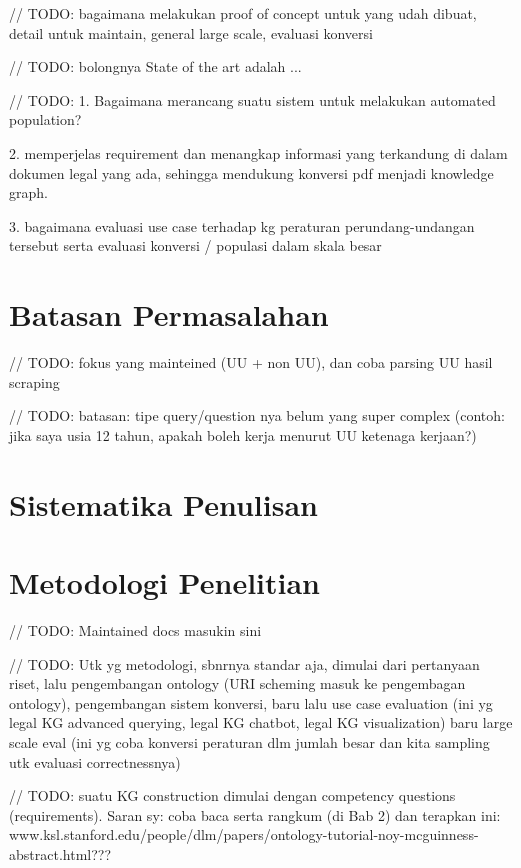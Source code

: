// TODO: bagaimana melakukan proof of concept untuk yang udah dibuat, detail untuk maintain, general
large scale, evaluasi konversi

// TODO: bolongnya State of the art adalah ...

// TODO: 1. Bagaimana merancang suatu sistem untuk melakukan automated population? 

2. memperjelas requirement dan menangkap informasi yang terkandung di dalam dokumen legal yang ada,
sehingga mendukung konversi pdf menjadi knowledge graph. 

3. bagaimana evaluasi use case terhadap kg peraturan perundang-undangan tersebut serta evaluasi
konversi / populasi dalam skala besar

\section{Batasan Permasalahan}\label{sec:batasan-permasalahan}

// TODO: fokus yang mainteined (UU + non UU), dan coba parsing UU hasil scraping

// TODO: batasan: tipe query/question nya belum yang super complex (contoh: jika saya usia 12 tahun,
apakah boleh kerja menurut UU ketenaga kerjaan?)

\section{Sistematika Penulisan}\label{sec:sistematika-penulisan}

\section{Metodologi Penelitian}\label{sec:metodologi-penelitian}
// TODO: Maintained docs masukin sini

// TODO: Utk yg metodologi, sbnrnya standar aja, dimulai dari pertanyaan riset, lalu pengembangan
ontology (URI scheming masuk ke pengembagan ontology), pengembangan sistem konversi, baru lalu use
case evaluation (ini yg legal KG advanced querying, legal KG chatbot, legal KG visualization) baru
large scale eval (ini yg coba konversi peraturan dlm jumlah besar dan kita sampling utk evaluasi
correctnessnya)

// TODO: suatu KG construction dimulai dengan competency questions (requirements). Saran sy: coba baca
serta rangkum (di Bab 2) dan terapkan ini:
www.ksl.stanford.edu/people/dlm/papers/ontology-tutorial-noy-mcguinness-abstract.html???




